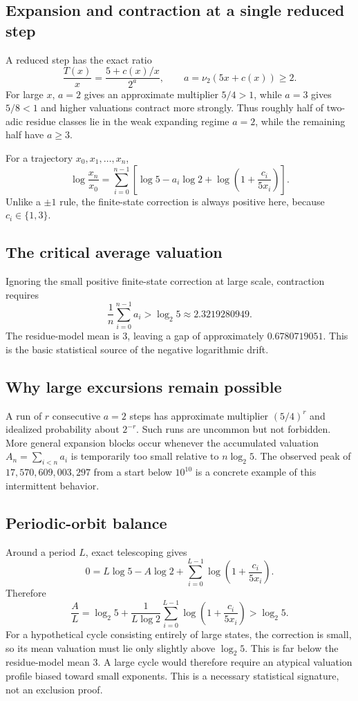 \documentclass[11pt]{article}
\newcommand{\vTwo}{\nu_2}
\begin{document}
\subsection{Expansion and contraction at a single reduced step}
A reduced step has the exact ratio
\begin{equation}
\frac{T(x)}x=\frac{5+c(x)/x}{2^a},\qquad a=\vTwo(5x+c(x))\ge2.
\end{equation}
For large $x$, $a=2$ gives an approximate multiplier $5/4>1$, while $a=3$ gives $5/8<1$ and higher valuations contract more strongly. Thus roughly half of two-adic residue classes lie in the weak expanding regime $a=2$, while the remaining half have $a\ge3$.

For a trajectory $x_0,x_1,\ldots,x_n$,
\begin{equation}
\log\frac{x_n}{x_0}=\sum_{i=0}^{n-1}\left[\log5-a_i\log2+\log\left(1+\frac{c_i}{5x_i}\right)\right].
\end{equation}
Unlike a $\pm1$ rule, the finite-state correction is always positive here, because $c_i\in\{1,3\}$.

\subsection{The critical average valuation}
Ignoring the small positive finite-state correction at large scale, contraction requires
\[
\frac1n\sum_{i=0}^{n-1}a_i>\log_2 5\approx2.3219280949.
\]
The residue-model mean is $3$, leaving a gap of approximately $0.6780719051$. This is the basic statistical source of the negative logarithmic drift.

\subsection{Why large excursions remain possible}
A run of $r$ consecutive $a=2$ steps has approximate multiplier $(5/4)^r$ and idealized probability about $2^{-r}$. Such runs are uncommon but not forbidden. More general expansion blocks occur whenever the accumulated valuation $A_n=\sum_{i<n}a_i$ is temporarily too small relative to $n\log_2 5$. The observed peak of $17,570,609,003,297$ from a start below $10^{10}$ is a concrete example of this intermittent behavior.

\subsection{Periodic-orbit balance}
Around a period $L$, exact telescoping gives
\begin{equation}
0=L\log5-A\log2+\sum_{i=0}^{L-1}\log\left(1+\frac{c_i}{5x_i}\right).
\end{equation}
Therefore
\begin{equation}
\frac AL=\log_2 5+\frac1{L\log2}\sum_{i=0}^{L-1}\log\left(1+\frac{c_i}{5x_i}\right)>\log_2 5.
\end{equation}
For a hypothetical cycle consisting entirely of large states, the correction is small, so its mean valuation must lie only slightly above $\log_2 5$. This is far below the residue-model mean $3$. A large cycle would therefore require an atypical valuation profile biased toward small exponents. This is a necessary statistical signature, not an exclusion proof.
\end{document}
